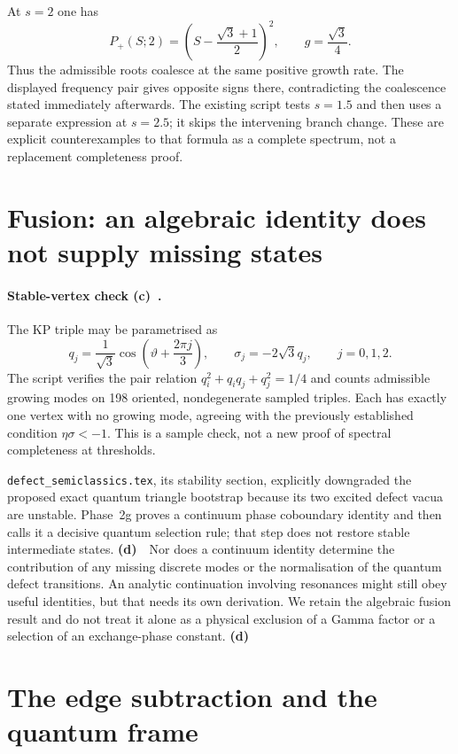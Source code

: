\documentclass[11pt,a4paper]{article}
\newcommand{\Lc}{\textsf{\textbf{(c)}}\ }
\newcommand{\Ld}{\textsf{\textbf{(d)}}\ }
\begin{document}
At $s=2$ one has
\[
 P_+(S;2)=\left(S-\frac{\sqrt3+1}{2}\right)^2,
 \qquad g=\frac{\sqrt3}{4}.
\]
Thus the admissible roots coalesce at the same positive growth rate.
The displayed frequency pair gives opposite signs there, contradicting
the coalescence stated immediately afterwards. The existing script tests
$s=1.5$ and then uses a separate expression at $s=2.5$; it skips the
intervening branch change. These are explicit counterexamples to that
formula as a complete spectrum, not a replacement completeness proof.

\section{Fusion: an algebraic identity does not supply missing states}
\paragraph{Stable-vertex check \Lc.}
The KP triple may be parametrised as
\[
 q_j=\frac{1}{\sqrt3}\cos\left(\vartheta+\frac{2\pi j}{3}\right),
 \qquad \sigma_j=-2\sqrt3 q_j,\qquad j=0,1,2.
\]
The script verifies the pair relation
$q_i^2+q_iq_j+q_j^2=1/4$ and counts admissible growing modes on
198 oriented, nondegenerate sampled triples. Each has exactly one vertex
with no growing mode, agreeing with the previously established condition
$\eta\sigma<-1$. This is a sample check, not a new proof of spectral
completeness at thresholds.

\texttt{defect\_semiclassics.tex}, its stability section, explicitly
downgraded the proposed exact quantum triangle bootstrap because its two
excited defect vacua are unstable. Phase~2g proves a continuum phase
coboundary identity and then calls it a decisive quantum selection rule;
that step does not restore stable intermediate states. \Ld\ Nor does a
continuum identity determine the contribution of any missing discrete modes
or the normalisation of the quantum defect transitions. An analytic
continuation involving resonances might still obey useful identities, but
that needs its own derivation. We retain the algebraic fusion result and
do not treat it alone as a physical exclusion of a Gamma factor or a
selection of an exchange-phase constant. \Ld

\section{The edge subtraction and the quantum frame}
\end{document}
